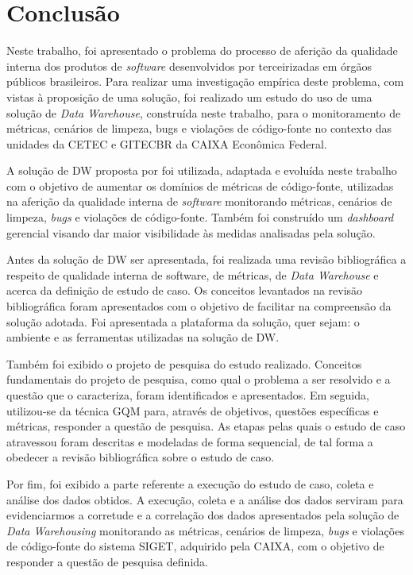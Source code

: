 \chapter{Conclusão}

Neste trabalho, foi apresentado o problema do processo de aferição da qualidade interna dos produtos de \textit{software} desenvolvidos por terceirizadas em órgãos públicos brasileiros. Para realizar uma investigação empírica deste problema, com vistas à proposição de uma solução, foi realizado um estudo do uso de uma solução de \textit{Data Warehouse}, construída neste trabalho, para o monitoramento de métricas, cenários de limpeza, bugs e violações de código-fonte no contexto das unidades da  CETEC e GITECBR da CAIXA Econômica Federal.

A solução de DW proposta por  foi utilizada, adaptada e evoluída neste trabalho com o objetivo de aumentar os domínios de métricas de código-fonte, utilizadas na aferição da qualidade interna de \textit{software} monitorando métricas, cenários de limpeza, \textit{bugs} e violações de código-fonte. Também foi construído um \textit{dashboard} gerencial visando dar maior visibilidade às medidas analisadas pela solução.

Antes da solução de DW ser apresentada, foi realizada uma revisão bibliográfica a respeito de qualidade interna de software, de métricas, de \textit{Data Warehouse} e acerca da definição de estudo de caso. Os conceitos levantados na revisão bibliográfica foram apresentados com o objetivo de facilitar na compreensão da solução adotada. Foi apresentada a plataforma da solução, quer sejam: o ambiente e as ferramentas utilizadas na solução de DW. 

Também foi exibido o projeto de pesquisa do estudo realizado. Conceitos fundamentais do projeto de pesquisa, como qual o problema a ser resolvido e a questão que o caracteriza, foram identificados e apresentados. Em seguida, utilizou-se da  técnica GQM para, através de objetivos, questões específicas e métricas, responder a questão de pesquisa. As etapas pelas quais o estudo de caso atravessou foram descritas e modeladas de forma sequencial, de tal forma a obedecer a revisão bibliográfica sobre o estudo de caso.

Por fim, foi exibido a parte referente a execução do estudo de caso, coleta e análise dos dados obtidos. A execução, coleta e a análise dos dados serviram para evidenciarmos a corretude e a correlação dos dados apresentados pela solução de \textit{Data Warehousing} monitorando as métricas, cenários de limpeza, \textit{bugs} e violações de código-fonte do sistema SIGET, adquirido pela CAIXA, com o objetivo de responder a questão de pesquisa definida.

